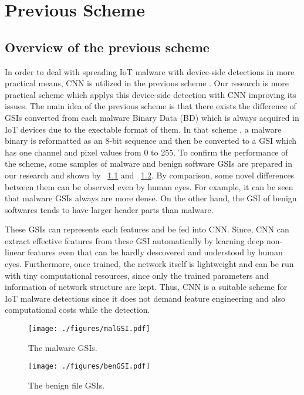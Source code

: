 \chapter{Previous Scheme}\label{sec:previous_scheme}
\section{Overview of the previous scheme} 
In order to deal with spreading IoT malware with device-side detections in more practical means, CNN is utilized in the previous scheme \cite{previous}.
Our research is more practical scheme which applys this device-side detection with CNN improving its issues.
The main idea of the previous scheme is that there exists the difference of GSIs converted from each malware Binary Data (BD) which is always acquired in IoT devices due to the exectable format of them.
In that scheme \cite{previous}, a malware binary is reformatted as an 8-bit sequence and then be converted to a GSI which has one channel and pixel values from 0 to 255.
To confirm the performance of the scheme, some samples of malware and benign software GSIs are prepared in our research and shown by \figurename~\ref{fig:malGSI} and \figurename~\ref{fig:benGSI}.
By comparison, some novel differences between them can be observed even by human eyes.
For example, it can be seen that malware GSIs always are more dense.
On the other hand, the GSI of benign softwares tends to have larger header parts than malware.

These GSIs can represents each features and be fed into CNN.
Since, CNN can extract effective features from these GSI automatically by learning deep non-linear features even that can be hardly descovered and understood by human eyes.
Furthermore, once trained, the network itself is lightweight and can be run with tiny computational resources, since only the trained parameters and information of network structure are kept.
Thus, CNN is a suitable scheme for IoT malware detections since it does not demand feature engineering and also computational costs while the detection.

\begin{figure}[h]
 \centering
 \texttt{[image: ./figures/malGSI.pdf]}
 \caption{The malware GSIs.} 
 \label{fig:malGSI}
\end{figure}
\begin{figure}[h]
 \centering
 \texttt{[image: ./figures/benGSI.pdf]}
 \caption{The benign file GSIs.} 
 \label{fig:benGSI}
\end{figure}

